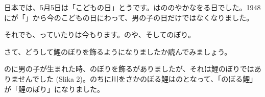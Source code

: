 
\author{autor}


	\begin{bunshou}
		\hspace{15pt}日本では、5月5日は「こどもの日」とう\hspace{5pt}です。は\hspace{10pt}ののやかなを\hspace{10pt}る日でした。\hspace{5pt}1948にが「」から今のこどもの日にわって、男の子の日だけではなくなりました。

		それでも、\hspace{10pt}っていたりは今もります。\hspace{5pt}の\hspace{10pt}や\hspace{10pt}、そしてのぼり。
	\end{bunshou}

	\fukudai{teži dio}
	\begin{bunshou}
		さて、どうして鯉のぼりを飾るようになりましたか読んでみましょう。

		のに男の子が生まれた時、のぼりを飾るがありましたが、それは鯉のぼりではありませんでした (Slika 2)。のちに川をさかのぼる鯉はの\hspace{10pt}となって、「のぼる鯉」が「鯉のぼり」になりました。
	\end{bunshou}

